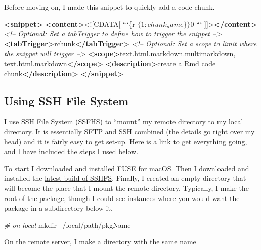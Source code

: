 \documentclass[]{book}
\newenvironment{Shaded}{\begin{snugshade}}{\end{snugshade}}
\newcommand{\BaseNTok}[1]{\textcolor[rgb]{0.00,0.00,0.81}{#1}}
\newcommand{\CommentTok}[1]{\textcolor[rgb]{0.56,0.35,0.01}{\textit{#1}}}
\newcommand{\FunctionTok}[1]{\textcolor[rgb]{0.00,0.00,0.00}{#1}}
\newcommand{\KeywordTok}[1]{\textcolor[rgb]{0.13,0.29,0.53}{\textbf{#1}}}
\newcommand{\NormalTok}[1]{#1}
\begin{document}
Before moving on, I made this snippet to quickly add a code chunk.

\begin{Shaded}
\begin{Highlighting}[]
\KeywordTok{<snippet>}
        \KeywordTok{<content>}\BaseNTok{<![CDATA[}
\NormalTok{```\{r $\{1:chunk_name\}\}}
\NormalTok{$0}
\NormalTok{```}
\BaseNTok{]]>}\KeywordTok{</content>}
        \CommentTok{<!-- Optional: Set a tabTrigger to define how to trigger the snippet -->}
        \KeywordTok{<tabTrigger>}\NormalTok{rchunk}\KeywordTok{</tabTrigger>}
        \CommentTok{<!-- Optional: Set a scope to limit where the snippet will trigger -->}
        \KeywordTok{<scope>}\NormalTok{text.html.markdown.multimarkdown, text.html.markdown}\KeywordTok{</scope>}
        \KeywordTok{<description>}\NormalTok{create a Rmd code chunk}\KeywordTok{</description>}
\KeywordTok{</snippet>}
\end{Highlighting}
\end{Shaded}

\hypertarget{using-ssh-file-system}{%
\subsection{Using SSH File System}\label{using-ssh-file-system}}

I use SSH File System (SSFHS) to ``mount'' my remote directory to my local directory. It is essentially SFTP and SSH combined (the details go right over my head) and it is fairly easy to get set-up. Here is a \href{https://github.com/osxfuse/osxfuse/wiki/SSHFS}{link} to get everything going, and I have included the steps I used below.

To start I downloaded and installed \href{https://osxfuse.github.io}{FUSE for macOS}. Then I downloaded and installed the \href{https://github.com/osxfuse/sshfs/releases}{latest build of SSHFS}. Finally, I created an empty directory that will become the place that I mount the remote directory. Typically, I make the root of the package, though I could see instances where you would want the package in a subdirectory below it.

\begin{Shaded}
\begin{Highlighting}[]
\CommentTok{# on local}
\FunctionTok{mkdir}\NormalTok{ ~/local/path/pkgName}
\end{Highlighting}
\end{Shaded}

On the remote server, I make a directory with the same name
\end{document}
